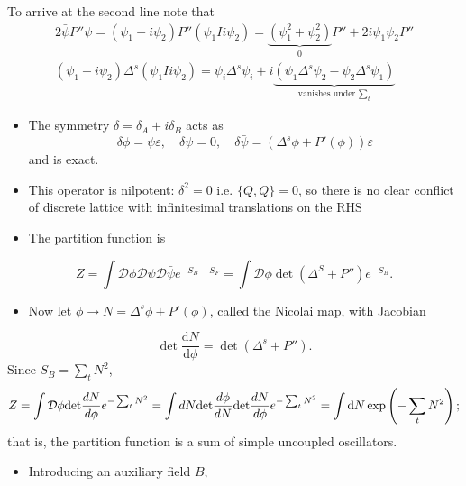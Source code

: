 To arrive at the second line note that 
\begin{align}
    2\bar\psi P''\psi= (\psi_1-i\psi_2)P''(\psi_1Ii\psi_2)=\underset{0}{\underbrace{(\psi_1^2+\psi_2^2)}}P''+2i\psi_1\psi_2 P'' \\
    (\psi_1-i\psi_2)\Delta^s(\psi_1Ii\psi_2)=\psi_i\Delta^s\psi_i + i \underset{\text{vanishes under $\sum_t$}}{\underbrace{(\psi_1\Delta^s\psi_2 - \psi_2\Delta^s\psi_1)}}
\end{align}
\begin{itemize}
    \item The symmetry $\delta = \delta_A + i \delta_B$ acts as 
    \begin{equation}
        \delta\phi = \psi \varepsilon, \quad \delta \psi = 0, \quad \delta \bar{\psi} = (\Delta^s\phi + P'(\phi))\varepsilon
    \end{equation}
    and is exact.
    \item This operator is nilpotent: $\delta^2 = 0$ i.e. $\{Q,Q\} = 0$, so there is no clear conflict of discrete lattice with infinitesimal translations on the RHS
    \item The partition function is
\end{itemize}
\begin{equation}
    Z = \int \mathcal{D}\phi \mathcal{D}\psi \mathcal{D}\bar{\psi}e^{-S_B - S_F} = \int \mathcal{D}\phi \operatorname{det}(\Delta^S + P'') e^{-S_B}.
\end{equation}
\begin{itemize}
    \item Now let $\phi \to N = \Delta^s\phi + P'(\phi)$, called the Nicolai map, with Jacobian
\end{itemize}
\begin{equation}
    \operatorname{det}\frac{\text{d}N}{\text{d}\phi} = \operatorname{det}(\Delta^s + P'').
\end{equation}
Since $S_B = \sum_t N^2$,
\begin{equation}
    Z = \int {\cal D}\phi {\rm det}\frac{dN}{d\phi}e^{-\sum_t N^2}
    = \int dN {\rm det}\frac{d\phi}{dN}{\rm det}\frac{dN}{d\phi}e^{-\sum_t N^2}
    =\int \text{d} N \exp\left(-\sum_t N^2\right);
\end{equation}
that is, the partition function is a sum of simple uncoupled oscillators.
\begin{itemize}
    \item Introducing an auxiliary field $B$,
\end{itemize}
